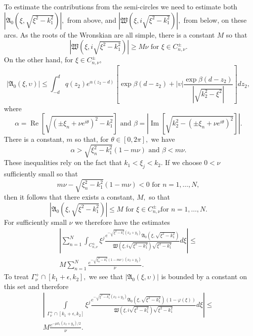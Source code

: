 \documentclass[11pt]{article}
\newcommand\fW{\mathfrak W}
\newcommand\fA{\mathfrak A}
\renewcommand\Re{\operatorname{Re}}
\renewcommand\Im{\operatorname{Im}}
\theoremstyle{definition}
\theoremstyle{remark}
\begin{document}
  To estimate the contributions from the semi-circles we need to
  estimate both $|\fA_0(\xi,\sqrt{\xi^2-k_1^2})|,$ from above, and
  $|\fW(\xi,i\sqrt{\xi^2-k_1^2})|,$ from below, on these
  arcs. As the roots of the Wronskian are all simple, there
  is a constant $M$ so that
  \begin{equation}
    |\fW(\xi,i\sqrt{\xi^2-k_1^2})|\geq M\nu\text{ for }\xi \in C^{\pm}_{n,\nu}.
  \end{equation}
  On the other hand, for $\xi\in C^{\pm}_{n,\nu},$ 
  \begin{equation}
  |\fA_0(\xi,\upsilon)|\leq \int_{-d}^{d}q(z_2)e^{\alpha(z_2-d)}
  \left[\exp\beta(d-z_2)+|\upsilon|\frac{\exp\beta(d-z_2)}{|\sqrt{k_2^2-\xi^2}|}\right]dz_2,
  \end{equation}
  where
  \begin{equation}
    \alpha=\Re\left[\sqrt{(\pm\xi_n+\nu e^{i\theta})^2-k_1^2}\right]\text{ and }
    \beta=\left|\Im\left[\sqrt{k_2^2-(\pm\xi_n+\nu e^{i\theta})^2}\right]\right|.
  \end{equation}
  There is a constant, $m$ so that, for $\theta\in [0,2\pi],$ we have
  \begin{equation}
    \alpha>\sqrt{\xi_n^2-k_1^2}(1-m\nu)\text{ and }
    \beta<m\nu.
  \end{equation}
  These inequalities rely on the fact that $k_1<\xi_j<k_2.$ If we choose $0<\nu$
  sufficiently small so that
  \begin{equation}
    m\nu-\sqrt{\xi_n^2-k_1^2}(1-m\nu)<0\text{ for }n=1,\dots,N,
  \end{equation}
  then it follows that there exists a constant, $M,$ so that
  \begin{equation}
    |\fA_0(\xi,\sqrt{\xi^2-k_1^2})|\leq M\text{ for }\xi\in C^{\pm}_{n,\nu}\text{
      for }n=1,\dots, N.
  \end{equation}
  For sufficiently small $\nu$ we therefore have the estimates
  \begin{multline}
    \left|\sum_{n=1}^N\int_{C_{n,\nu}^{\pm}}\xi^j\frac{e^{-\sqrt{\xi^2-k_1^2}(x_2+y_2)}\fA_0(\xi,\sqrt{\xi^2-k_1^2})}
              {\fW(\xi,i\sqrt{\xi^2-k_1^2})\sqrt{\xi^2-k_1^2}}d\xi\right|\leq\\
              M\sum_{n=1}^N\frac{e^{-\sqrt{\xi_n^2-k_1^2}(1-m\nu)(x_2+y_2)}}{\nu}.
  \end{multline}
  To treat $\Gamma_{\nu}^+\cap [k_1+\epsilon,k_2],$ we see that $|\fA_0(\xi,\upsilon)|$ is
  bounded by a constant on this set and therefore
  \begin{multline}
    \left|\,\int\limits_{\Gamma_{\nu}^+\cap
      [k_1+\epsilon,k_2]}\xi^j\frac{e^{-\sqrt{\xi^2-k_1^2}(x_2+y_2)}\fA_0(\xi,\sqrt{\xi^2-k_1^2})(1-\varphi(\xi))}
                       {\fW(\xi,i\sqrt{\xi^2-k_1^2})\sqrt{\xi^2-k_1^2}}d\xi\right|\leq\\ M\frac{e^{-\mu
                           k_1(x_2+y_2)/2}}{\nu}.
  \end{multline}
\end{document}
